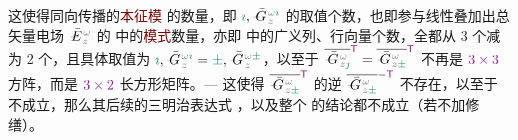 这使得同向传播的\textcolor{Maroon}{本征模}  的数量，即 $\textcolor{PineGreen}{\imath}, \Xint{\mathcolor{gray}{-}}{16}{\bar{G}}^{\;\!\mathcolor{gray}{\omega} \textcolor{PineGreen}{\imath}}_{\;\! \mathcolor{gray}{z}}$ 的取值个数，也即参与\textcolor{PineGreen}{线性叠加}出\textcolor{PineGreen}{总矢量电场} $\Xint{\mathcolor{gray}{-}}{25}{\bar{E}}^{\;\!\mathcolor{gray}{\omega}}_{\;\! \mathcolor{gray}{z}}$ 的 中的\textcolor{Maroon}{模式}数量，亦即  中的广义列、行向量个数，全都从 3 个减为 2 个，且具体取值为 $\textcolor{PineGreen}{\imath}, \Xint{\mathcolor{gray}{-}}{16}{\bar{G}}^{\;\!\mathcolor{gray}{\omega} \textcolor{PineGreen}{\imath}}_{\;\! \mathcolor{gray}{z}} = \textcolor{PineGreen}{\pm}, \Xint{\mathcolor{gray}{-}}{16}{\bar{G}}^{\;\!\mathcolor{gray}{\omega} \textcolor{PineGreen}{\pm}}_{\;\! \mathcolor{gray}{z}}$，以至于 $\overline{\Xint{\mathcolor{gray}{-}}{16}{\bar{G}}^{\;\!\mathcolor{gray}{\omega}}_{\;\! \mathcolor{gray}{z} \textcolor{PineGreen}{\jmath}}}^{\mathsf{\textcolor{Plum}{T}}} = \overline{\Xint{\mathcolor{gray}{-}}{16}{\bar{G}}^{\;\!\mathcolor{gray}{\omega}}_{\;\! \mathcolor{gray}{z} \textcolor{PineGreen}{\pm}}}^{\mathsf{\textcolor{Plum}{T}}}$ 不再是 $\textcolor{Plum}{3 \times 3}$ 方阵，而是 $\textcolor{Plum}{3 \times 2}$ 长方形矩阵。--- 这使得 $\overline{\Xint{\mathcolor{gray}{-}}{16}{\bar{G}}^{\;\!\mathcolor{gray}{\omega}}_{\;\! \mathcolor{gray}{z} \textcolor{PineGreen}{\pm}}}^{\mathsf{\textcolor{Plum}{T}}}$ 的逆 $\overline{\Xint{\mathcolor{gray}{-}}{16}{\bar{G}}^{\;\!\mathcolor{gray}{\omega}}_{\;\! \mathcolor{gray}{z} \textcolor{PineGreen}{\pm}}}^{-\mathsf{\textcolor{Plum}{T}}}$ 不存在，以至于  不成立，那么其后续的三明治表达式 ，以及整个  的结论都不成立（若不加修缮）。

